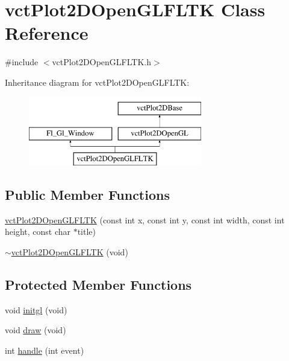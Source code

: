 \hypertarget{classvct_plot2_d_open_g_l_f_l_t_k}{\section{vct\-Plot2\-D\-Open\-G\-L\-F\-L\-T\-K Class Reference}
\label{classvct_plot2_d_open_g_l_f_l_t_k}
}


{\ttfamily \#include $<$vct\-Plot2\-D\-Open\-G\-L\-F\-L\-T\-K.\-h$>$}

Inheritance diagram for vct\-Plot2\-D\-Open\-G\-L\-F\-L\-T\-K\-:\begin{figure}[H]
\begin{center}
\leavevmode
\includegraphics[height=3.000000cm]{d3/dc7/classvct_plot2_d_open_g_l_f_l_t_k}
\end{center}
\end{figure}
\subsection*{Public Member Functions}
\begin{DoxyCompactItemize}
\item 
\hyperlink{classvct_plot2_d_open_g_l_f_l_t_k_aca6e39baf7bc695ae114921b6af3f422}{vct\-Plot2\-D\-Open\-G\-L\-F\-L\-T\-K} (const int x, const int y, const int width, const int height, const char $\ast$title)
\item 
\hyperlink{classvct_plot2_d_open_g_l_f_l_t_k_a65d2f91381159a8bad81a73f43db5bb9}{$\sim$vct\-Plot2\-D\-Open\-G\-L\-F\-L\-T\-K} (void)
\end{DoxyCompactItemize}
\subsection*{Protected Member Functions}
{\bf }\par
\begin{DoxyCompactItemize}
\item 
void \hyperlink{classvct_plot2_d_open_g_l_f_l_t_k_a66344a83a421e77f00c708a81a7d1f9c}{initgl} (void)
\item 
void \hyperlink{classvct_plot2_d_open_g_l_f_l_t_k_a6cff7bc71c830083ed646cc25e5d855a}{draw} (void)
\item 
int \hyperlink{classvct_plot2_d_open_g_l_f_l_t_k_a9cb73c6bbde698823cf09f926f9820d7}{handle} (int event)
\end{DoxyCompactItemize}

